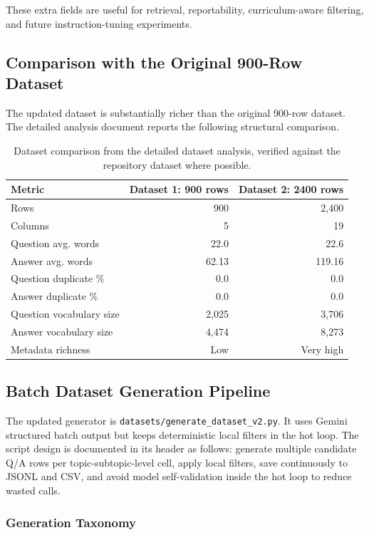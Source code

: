 \documentclass[11pt,a4paper]{article}
\begin{document}
These extra fields are useful for retrieval, reportability, curriculum-aware filtering, and future instruction-tuning experiments.

\subsection{Comparison with the Original 900-Row Dataset}

The updated dataset is substantially richer than the original 900-row dataset. The detailed analysis document reports the following structural comparison.

\begin{table}[H]
\centering
\begin{tabular}{lrr}
\toprule
\textbf{Metric} & \textbf{Dataset 1: 900 rows} & \textbf{Dataset 2: 2400 rows} \\
\midrule
Rows & 900 & 2,400 \\
Columns & 5 & 19 \\
Question avg. words & 22.0 & 22.6 \\
Answer avg. words & 62.13 & 119.16 \\
Question duplicate \% & 0.0 & 0.0 \\
Answer duplicate \% & 0.0 & 0.0 \\
Question vocabulary size & 2,025 & 3,706 \\
Answer vocabulary size & 4,474 & 8,273 \\
Metadata richness & Low & Very high \\
\bottomrule
\end{tabular}
\caption{Dataset comparison from the detailed dataset analysis, verified against the repository dataset where possible.}
\end{table}

\subsection{Batch Dataset Generation Pipeline}

The updated generator is \texttt{datasets/generate\_dataset\_v2.py}. It uses Gemini structured batch output but keeps deterministic local filters in the hot loop. The script design is documented in its header as follows: generate multiple candidate Q/A rows per topic-subtopic-level cell, apply local filters, save continuously to JSONL and CSV, and avoid model self-validation inside the hot loop to reduce wasted calls.

\subsubsection{Generation Taxonomy}
\end{document}
